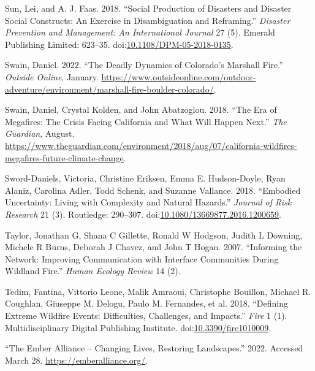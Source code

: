 \documentclass[
]{article}
\newlength{\cslhangindent}
\newenvironment{CSLReferences}[2] %
 {\begin{list}{}{%
  \setlength{\itemindent}{0pt}
  \setlength{\leftmargin}{0pt}
  \setlength{\parsep}{0pt}
  \ifodd #1
   \setlength{\leftmargin}{\cslhangindent}
   \setlength{\itemindent}{-1\cslhangindent}
  \fi
  \setlength{\itemsep}{#2\baselineskip}}}
 {\end{list}}
\begin{document}
\begin{CSLReferences}{1}{0}
Sun, Lei, and A. J. Faas. 2018. {``Social Production of Disasters and Disaster Social Constructs: {An} Exercise in Disambiguation and Reframing.''} \emph{Disaster Prevention and Management: An International Journal} 27 (5). Emerald Publishing Limited: 623--35. doi:\href{https://doi.org/10.1108/DPM-05-2018-0135}{10.1108/DPM-05-2018-0135}.

Swain, Daniel. 2022. {``The {Deadly Dynamics} of {Colorado}'s {Marshall Fire}.''} \emph{Outside Online}, January. \url{https://www.outsideonline.com/outdoor-adventure/environment/marshall-fire-boulder-colorado/}.

Swain, Daniel, Crystal Kolden, and John Abatzoglou. 2018. {``The Era of Megafires: The Crisis Facing {California} and What Will Happen Next.''} \emph{The Guardian}, August. \url{https://www.theguardian.com/environment/2018/aug/07/california-wildfires-megafires-future-climate-change}.

Sword-Daniels, Victoria, Christine Eriksen, Emma E. Hudson-Doyle, Ryan Alaniz, Carolina Adler, Todd Schenk, and Suzanne Vallance. 2018. {``Embodied Uncertainty: Living with Complexity and Natural Hazards.''} \emph{Journal of Risk Research} 21 (3). Routledge: 290--307. doi:\href{https://doi.org/10.1080/13669877.2016.1200659}{10.1080/13669877.2016.1200659}.

Taylor, Jonathan G, Shana C Gillette, Ronald W Hodgson, Judith L Downing, Michele R Burns, Deborah J Chavez, and John T Hogan. 2007. {``Informing the {Network}: {Improving Communication} with {Interface Communities During Wildland Fire}.''} \emph{Human Ecology Review} 14 (2).

Tedim, Fantina, Vittorio Leone, Malik Amraoui, Christophe Bouillon, Michael R. Coughlan, Giuseppe M. Delogu, Paulo M. Fernandes, et al. 2018. {``Defining {Extreme Wildfire Events}: {Difficulties}, {Challenges}, and {Impacts}.''} \emph{Fire} 1 (1). Multidisciplinary Digital Publishing Institute. doi:\href{https://doi.org/10.3390/fire1010009}{10.3390/fire1010009}.

{``The {Ember Alliance} -- {Changing Lives}, {Restoring Landscapes}.''} 2022. Accessed March 28. \url{https://emberalliance.org/}.


\end{CSLReferences}
\end{document}
